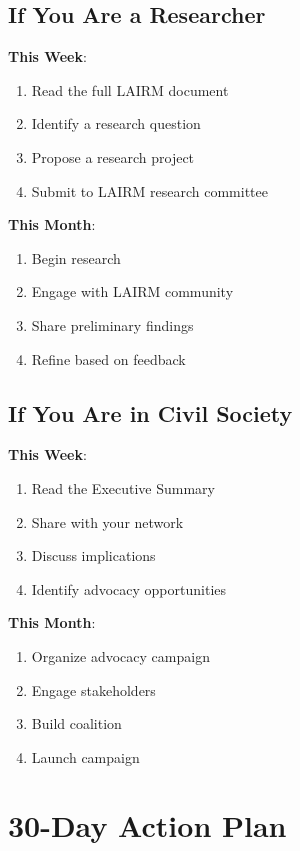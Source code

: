 \documentclass[12pt,a4paper,twoside,openright]{book}
\begin{document}
\subsection{If You Are a Researcher}

\textbf{This Week}:
\begin{enumerate}
    \item Read the full LAIRM document
    \item Identify a research question
    \item Propose a research project
    \item Submit to LAIRM research committee
\end{enumerate}

\textbf{This Month}:
\begin{enumerate}
    \item Begin research
    \item Engage with LAIRM community
    \item Share preliminary findings
    \item Refine based on feedback
\end{enumerate}

\subsection{If You Are in Civil Society}

\textbf{This Week}:
\begin{enumerate}
    \item Read the Executive Summary
    \item Share with your network
    \item Discuss implications
    \item Identify advocacy opportunities
\end{enumerate}

\textbf{This Month}:
\begin{enumerate}
    \item Organize advocacy campaign
    \item Engage stakeholders
    \item Build coalition
    \item Launch campaign
\end{enumerate}

\section{30-Day Action Plan}
\end{document}
